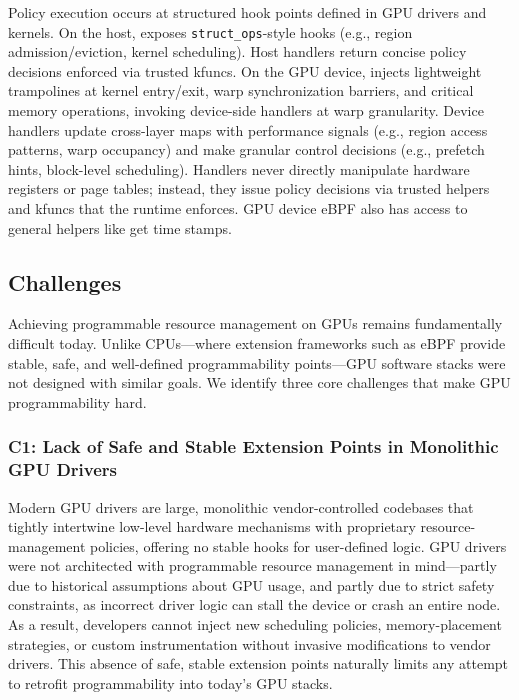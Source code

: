 Policy execution occurs at structured hook points defined in GPU drivers and kernels. On the host, \sysdriver exposes \texttt{struct\_ops}-style hooks (e.g., region admission/eviction, kernel scheduling). Host handlers return concise policy decisions enforced via trusted kfuncs. On the GPU device, \sys injects lightweight trampolines at kernel entry/exit, warp synchronization barriers, and critical memory operations, invoking device-side handlers at warp granularity. Device handlers update cross-layer maps with performance signals (e.g., region access patterns, warp occupancy) and make granular control decisions (e.g., prefetch hints, block-level scheduling). Handlers never directly manipulate hardware registers or page tables; instead, they issue policy decisions via trusted helpers and kfuncs that the runtime enforces. GPU device eBPF also has access to general helpers like get time stamps.

\subsection{Challenges}
\label{sec:challenges}
Achieving programmable resource management on GPUs remains fundamentally difficult today. 
Unlike CPUs—where extension frameworks such as eBPF provide stable, safe, and well-defined programmability points—GPU software stacks were not designed with similar goals. 
We identify three core challenges that make GPU programmability hard.

\subsubsection{C1: Lack of Safe and Stable Extension Points in Monolithic GPU Drivers}
Modern GPU drivers are large, monolithic vendor-controlled codebases that tightly intertwine low-level hardware mechanisms with proprietary resource-management policies, offering no stable hooks for user-defined logic. 
GPU drivers were not architected with programmable resource management in mind—partly due to historical assumptions about GPU usage, and partly due to strict safety constraints, as incorrect driver logic can stall the device or crash an entire node. 
As a result, developers cannot inject new scheduling policies, memory-placement strategies, or custom instrumentation without invasive modifications to vendor drivers. This absence of safe, stable extension points naturally limits any attempt to retrofit programmability into today's GPU stacks.

